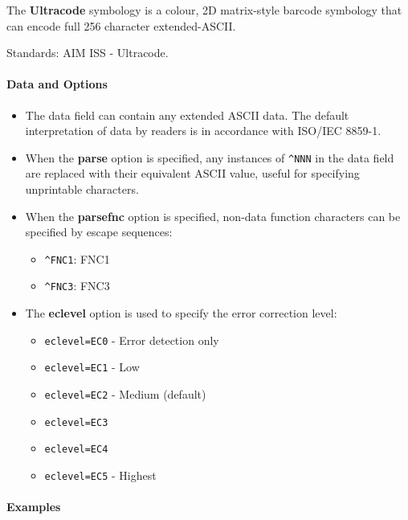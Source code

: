 The \textbf{Ultracode} symbology is a colour, 2D matrix-style barcode
symbology that can encode full 256 character extended-ASCII.

Standards: AIM ISS - Ultracode.

\hypertarget{data-and-options-67}{%
\paragraph{Data and Options}\label{data-and-options-67}}

\begin{itemize}
\tightlist
\item
  The data field can contain any extended ASCII data. The default
  interpretation of data by readers is in accordance with ISO/IEC
  8859-1.
\item
  When the \textbf{parse} option is specified, any instances of
  \texttt{\^{}NNN} in the data field are replaced with their equivalent
  ASCII value, useful for specifying unprintable characters.
\item
  When the \textbf{parsefnc} option is specified, non-data function
  characters can be specified by escape sequences:

  \begin{itemize}
  \tightlist
  \item
    \texttt{\^{}FNC1}: FNC1
  \item
    \texttt{\^{}FNC3}: FNC3
  \end{itemize}
\item
  The \textbf{eclevel} option is used to specify the error correction
  level:

  \begin{itemize}
  \tightlist
  \item
    \texttt{eclevel=EC0} - Error detection only
  \item
    \texttt{eclevel=EC1} - Low
  \item
    \texttt{eclevel=EC2} - Medium (default)
  \item
    \texttt{eclevel=EC3}
  \item
    \texttt{eclevel=EC4}
  \item
    \texttt{eclevel=EC5} - Highest
  \end{itemize}
\end{itemize}

\hypertarget{examples-44}{%
\paragraph{Examples}\label{examples-44}}

